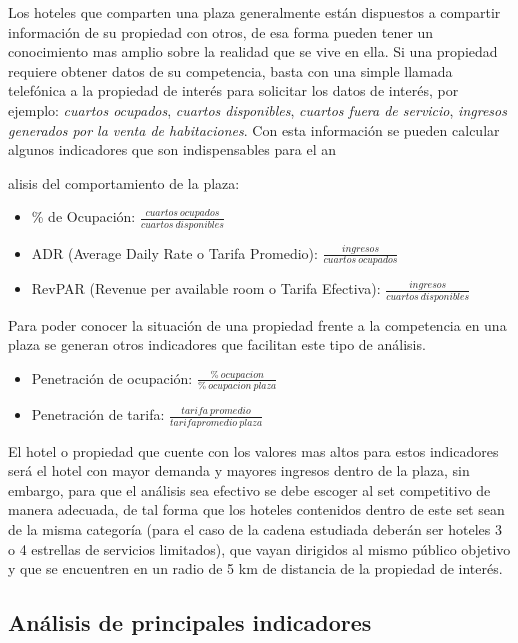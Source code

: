 Los hoteles que comparten una plaza generalmente están dispuestos a compartir información de su propiedad con otros, de esa forma pueden tener un conocimiento mas amplio sobre la realidad que se vive en ella. Si una propiedad requiere obtener datos de su competencia, basta con una simple llamada telefónica a la propiedad de interés para solicitar los datos de interés, por ejemplo: \emph{cuartos ocupados}, \emph{cuartos disponibles}, \emph{cuartos fuera de servicio}, \emph{ingresos generados por la venta de habitaciones}. Con esta información se pueden calcular algunos indicadores que son indispensables para el an{alisis del comportamiento de la plaza:
\begin{itemize}
  \item \% de Ocupación: $\frac{cuartos\ ocupados}{cuartos\ disponibles}$
  \item ADR (Average Daily Rate o Tarifa Promedio): $\frac{ingresos}{cuartos\ ocupados}$
  \item RevPAR (Revenue per available room o Tarifa Efectiva): $\frac{ingresos}{cuartos\ disponibles}$
\end{itemize}

Para poder conocer la situación de una propiedad frente a la competencia en una plaza se generan otros indicadores que facilitan este tipo de análisis.

\begin{itemize}
  \item Penetración de ocupación: $\frac{\%\ ocupacion}{\%\ ocupacion\ plaza}$
  \item Penetración de tarifa: $\frac{tarifa\ promedio}{tarifa promedio\ plaza}$
\end{itemize}

El hotel o propiedad que cuente con los valores mas altos para estos indicadores será el hotel con mayor demanda y mayores ingresos dentro de la plaza, sin embargo, para que el análisis sea efectivo se debe escoger al set competitivo de manera adecuada, de tal forma que los hoteles contenidos dentro de este set sean de la misma categoría (para el caso de la cadena estudiada deberán ser hoteles 3 o 4 estrellas de servicios limitados), que vayan dirigidos al mismo público objetivo y que se encuentren en un radio de 5 km de distancia de la propiedad de interés.


\subsection*{Análisis de principales indicadores}

}
